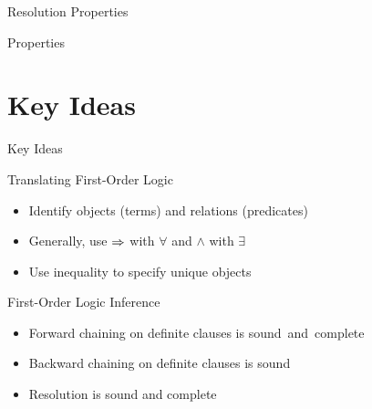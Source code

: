 \documentclass[14pt]{beamer}
\begin{document}
\begin{frame}{Resolution Properties}
\begin{block}{Properties}
\begin{description}[Complete?]
\item[Sound?]
\item[Complete?]
\end{description}
\bigskip
{}
\end{block}
\end{frame}

\part{Key Ideas}
\begin{frame}{Key Ideas}
	\begin{block}{Translating First-Order Logic}
		\begin{itemize}
			\item Identify objects (terms) and relations (predicates)
			\item Generally, use $\Rightarrow$ with $\forall$ and $\land$ with $\exists$
			\item Use inequality to specify unique objects
		\end{itemize}
	\end{block}
	\begin{block}{First-Order Logic Inference}
		\begin{itemize}
			\item Forward chaining on definite clauses is \mbox{sound and complete}
			\item Backward chaining on definite clauses is sound
			\item Resolution is sound and complete
		\end{itemize}
	\end{block}
\end{frame}
\end{document}
